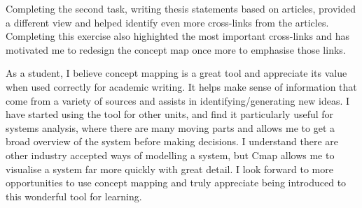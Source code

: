 \documentclass[a4paper, 12pt]{article}
\begin{document}
Completing the second task, writing thesis statements based on articles, provided a different view and helped identify even more cross-links from the articles. Completing this exercise also highighted the most important cross-links and has motivated me to redesign the concept map once more to emphasise those links.

As a student, I believe concept mapping is a great tool and appreciate its value when used correctly for academic writing. It helps make sense of information that come from a variety of sources and assists in identifying/generating new ideas. I have started using the tool for other units, and find it particularly useful for systems analysis, where there are many moving parts and allows me to get a broad overview of the system before making decisions. I understand there are other industry accepted ways of modelling a system, but Cmap allows me to visualise a system far more quickly with great detail. I look forward to more opportunities to use concept mapping and truly appreciate being introduced to this wonderful tool for learning.





\end{document}

